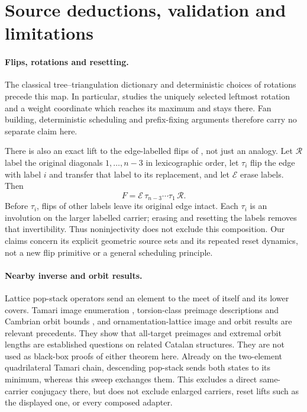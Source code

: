 \section{Source deductions, validation and limitations}\label{sec:scope}

\paragraph{Flips, rotations and resetting.}
The classical tree--triangulation dictionary and deterministic choices of
rotations precede this map. In particular, \citet{pallo2006} studies the
uniquely selected leftmost rotation and a weight coordinate which reaches
its maximum and stays there. Fan building, deterministic scheduling and
prefix-fixing arguments therefore carry no separate claim here.

There is also an exact lift to the edge-labelled flips of
\citet{bose2018}, not just an analogy. Let \(\mathcal R\) label the original
diagonals \(1,\ldots,n-3\) in lexicographic order, let \(\tau_i\) flip the
edge with label \(i\) and transfer that label to its replacement, and let
\(\mathcal E\) erase labels. Then
\[
 F=\mathcal E\,\tau_{n-3}\cdots\tau_1\,\mathcal R.
\]
Before \(\tau_i\), flips of other labels leave its original edge intact.
Each \(\tau_i\) is an involution on the larger labelled carrier; erasing
and resetting the labels removes that invertibility. Thus noninjectivity
does not exclude this composition. Our claims concern its explicit
geometric source sets and its repeated reset dynamics, not a new flip
primitive or a general scheduling principle.

\paragraph{Nearby inverse and orbit results.}
Lattice pop-stack operators send an element to the meet of itself and its
lower covers. Tamari image enumeration \citep{hong2022}, torsion-class
preimage descriptions and Cambrian orbit bounds
\citep[Theorem~5.3 and Section~9]{barnard2023}, and ornamentation-lattice
image and orbit results \citep{ajran2025} are relevant precedents.
They show that all-target preimages and extremal orbit lengths are
established questions on related Catalan structures. They are not used
as black-box proofs of either theorem here. Already on the two-element
quadrilateral Tamari chain, descending pop-stack sends both states to
its minimum, whereas this sweep exchanges them. This excludes a direct
same-carrier conjugacy there, but does not exclude enlarged carriers,
reset lifts such as the displayed one, or every composed adapter.


